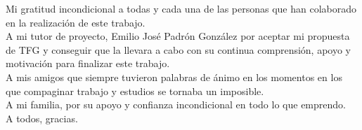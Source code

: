 \documentclass[11pt,a4paper,titlepage,oneside]{report}
\begin{document}

 
 
 \paxinaenbranco
 \begin{agradecementos}
 Mi gratitud incondicional a todas y cada una de las personas que han colaborado en la realización de este trabajo.\\ 
 A mi tutor de proyecto, Emilio José Padrón González por aceptar mi propuesta de TFG y conseguir que la llevara a cabo con su continua comprensión, apoyo y motivación para finalizar este trabajo.\\
 A mis amigos que siempre tuvieron palabras de ánimo en los momentos en los que compaginar trabajo y estudios se tornaba un imposible. \\
 A mi familia, por su apoyo y confianza incondicional en todo lo que emprendo. \\
 A todos, gracias.
 \end{agradecementos}
 

 \setcounter{page}{1}

 \tableofcontents
 \listoffigures
 \listoftables
 \clearpage
 
 \setcounter{page}{1}


 
 
 
  
  
  
 
%
 


 \appendix
 \appendixpage
 
 
%

 \printglossary[type=\acronymtype,title=\nomeglosarioacronimos]
 \printglossary[title=\nomeglosariotermos]

 
 

 \clearpage
 
\end{document}
